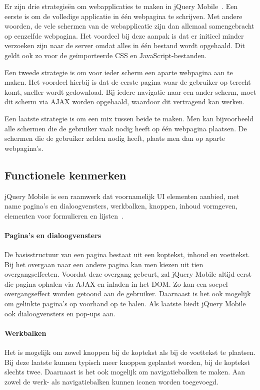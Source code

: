 Er zijn drie strategieën om webapplicaties te maken in jQuery Mobile~\cite{Broulik2012}. Een eerste is om de volledige applicatie in één webpagina te schrijven. Met andere woorden,  de vele schermen van de webapplicatie zijn dan allemaal samengebracht op eenzelfde webpagina. Het voordeel bij deze aanpak is dat er initieel minder verzoeken zijn naar de server omdat alles in één bestand wordt opgehaald. Dit geldt ook zo voor de geïmporteerde CSS en JavaScript-bestanden. 

Een tweede strategie is om voor ieder scherm een aparte webpagina aan te maken. Het voordeel hierbij is dat de eerste pagina waar de gebruiker op terecht komt, sneller wordt gedownload. Bij iedere navigatie naar een ander scherm, moet dit scherm via AJAX worden opgehaald, waardoor dit vertragend kan werken. 

Een laatste strategie is om een mix tussen beide te maken. Men kan bijvoorbeeld alle schermen die de gebruiker vaak nodig heeft op één webpagina plaatsen. De schermen die de gebruiker zelden nodig heeft, plaats men dan op aparte webpagina's.  

\subsection{Functionele kenmerken}
jQuery Mobile is een raamwerk dat voornamelijk UI elementen aanbied, met name pagina's en dialoogvensters, werkbalken, knoppen, inhoud vormgeven, elementen voor formulieren en lijsten~\cite{JQuery2012b}.

\paragraph{Pagina's en dialoogvensters}
De basisstructuur van een pagina bestaat uit een koptekst, inhoud en voettekst. Bij het overgaan naar een andere pagina kan men kiezen uit tien overgangseffecten. Voordat deze overgang gebeurt, zal jQuery Mobile altijd eerst die pagina ophalen via AJAX en inladen in het DOM. Zo kan een soepel overgangseffect worden getoond aan de gebruiker. Daarnaast is het ook mogelijk om gelinkte pagina's op voorhand op te halen. Als laatste biedt jQuery Mobile ook dialoogvensters en pop-ups aan. 

\paragraph{Werkbalken}
Het is mogelijk om zowel knoppen bij de koptekst als bij de voettekst te plaatsen. Bij deze laatste kunnen typisch meer knoppen geplaatst worden, bij de koptekst slechts twee. Daarnaast is het ook mogelijk om navigatiebalken te maken. Aan zowel de werk- als navigatiebalken kunnen iconen worden toegevoegd.


